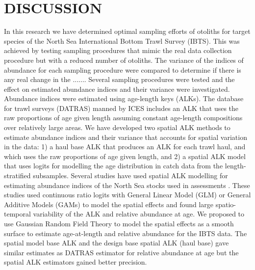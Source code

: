 \documentclass[a4paper 12pt]{article}
\numberwithin{equation}{section}
\begin{document}
\section{DISCUSSION}
\label{sec:discussion}
In this research we have determined optimal sampling efforts of otoliths for target species of the North Sea International Bottom Trawl Survey (IBTS). This was achieved by testing sampling procedures that mimic the real data collection procedure but with a reduced number of otoliths. The variance of the indices of abundance for each sampling procedure were compared to determine if there is any real change in the ....... Several sampling procedures were tested and the effect on estimated abundance indices and their variance were investigated. Abundance indices were estimated using age-length keys (ALKs). The database for trawl surveys (DATRAS) manned by ICES includes an ALK that uses the raw proportions of age given length assuming constant age-length compositions over relatively large areas. We have developed two spatial ALK methods  to estimate abundance indices and their variance that accounts for spatial variation in the data: 1) a haul base ALK that produces an ALK for each trawl haul, and which uses the raw proportions of age given length, and 2) a spatial ALK model that uses logits for modelling the age distribution in catch data from the length-stratified  subsamples. Several studies have used spatial ALK modelling for estimating abundance indices of the North Sea stocks used in  assessments \citep{berg2012spatial, berg2014evaluation, gerritsen2006simple}. These studies used continuous ratio logits with General Linear Model (GLM) or General Additive Models (GAMs) to model the spatial effects and found large spatio-temporal variability of the ALK and relative abundance at age. We proposed to use Gaussian Random Field Theory to model the spatial effects as a smooth surface to estimate age-at-length and relative abundance for the IBTS data. The spatial model base ALK and the design base spatial ALK (haul base) gave similar estimates as DATRAS estimator for relative abundance at age but the spatial ALK estimators gained better precision. 
\end{document}
